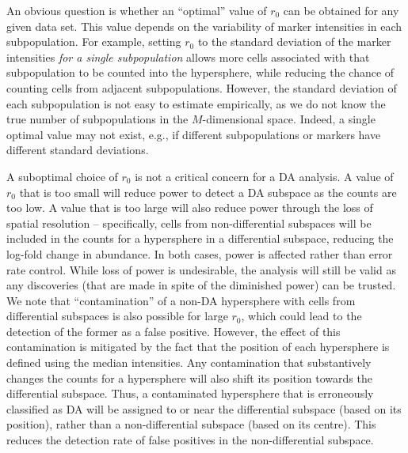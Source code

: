 \documentclass{article}
\begin{document}
An obvious question is whether an ``optimal'' value of $r_0$ can be obtained for any given data set.
This value depends on the variability of marker intensities in each subpopulation.
For example, setting $r_0$ to the standard deviation of the marker intensities \textit{for a single subpopulation} allows more cells associated with that subpopulation to be counted into the hypersphere, while reducing the chance of counting cells from adjacent subpopulations.
However, the standard deviation of each subpopulation is not easy to estimate empirically, as we do not know the true number of subpopulations in the $M$-dimensional space.
Indeed, a single optimal value may not exist, e.g., if different subpopulations or markers have different standard deviations.

A suboptimal choice of $r_0$ is not a critical concern for a DA analysis.
A value of $r_0$ that is too small will reduce power to detect a DA subspace as the counts are too low.
A value that is too large will also reduce power through the loss of spatial resolution -- specifically, cells from non-differential subspaces will be included in the counts for a hypersphere in a differential subspace, reducing the log-fold change in abundance.
In both cases, power is affected rather than error rate control.
While loss of power is undesirable, the analysis will still be valid as any discoveries (that are made in spite of the diminished power) can be trusted.
We note that ``contamination'' of a non-DA hypersphere with cells from differential subspaces is also possible for large $r_0$, which could lead to the detection of the former as a false positive.
However, the effect of this contamination is mitigated by the fact that the position of each hypersphere is defined using the median intensities.
Any contamination that substantively changes the counts for a hypersphere will also shift its position towards the differential subspace.
Thus, a contaminated hypersphere that is erroneously classified as DA will be assigned to or near the differential subspace (based on its position), rather than a non-differential subspace (based on its centre).
This reduces the detection rate of false positives in the non-differential subspace.
\end{document}
